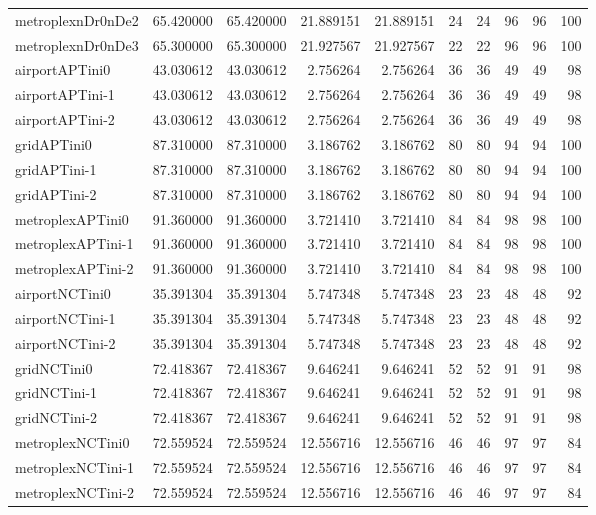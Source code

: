 \begin{longtable}{|l|r|r|r|r|r|r|r|r|r|}
metroplexnDr0nDe2 & 65.420000 & 65.420000 & 21.889151 & 21.889151 & 24 & 24 & 96 & 96 & 100 \\
metroplexnDr0nDe3 & 65.300000 & 65.300000 & 21.927567 & 21.927567 & 22 & 22 & 96 & 96 & 100 \\
airportAPTini0 & 43.030612 & 43.030612 & 2.756264 & 2.756264 & 36 & 36 & 49 & 49 & 98 \\
airportAPTini-1 & 43.030612 & 43.030612 & 2.756264 & 2.756264 & 36 & 36 & 49 & 49 & 98 \\
airportAPTini-2 & 43.030612 & 43.030612 & 2.756264 & 2.756264 & 36 & 36 & 49 & 49 & 98 \\
gridAPTini0 & 87.310000 & 87.310000 & 3.186762 & 3.186762 & 80 & 80 & 94 & 94 & 100 \\
gridAPTini-1 & 87.310000 & 87.310000 & 3.186762 & 3.186762 & 80 & 80 & 94 & 94 & 100 \\
gridAPTini-2 & 87.310000 & 87.310000 & 3.186762 & 3.186762 & 80 & 80 & 94 & 94 & 100 \\
metroplexAPTini0 & 91.360000 & 91.360000 & 3.721410 & 3.721410 & 84 & 84 & 98 & 98 & 100 \\
metroplexAPTini-1 & 91.360000 & 91.360000 & 3.721410 & 3.721410 & 84 & 84 & 98 & 98 & 100 \\
metroplexAPTini-2 & 91.360000 & 91.360000 & 3.721410 & 3.721410 & 84 & 84 & 98 & 98 & 100 \\
airportNCTini0 & 35.391304 & 35.391304 & 5.747348 & 5.747348 & 23 & 23 & 48 & 48 & 92 \\
airportNCTini-1 & 35.391304 & 35.391304 & 5.747348 & 5.747348 & 23 & 23 & 48 & 48 & 92 \\
airportNCTini-2 & 35.391304 & 35.391304 & 5.747348 & 5.747348 & 23 & 23 & 48 & 48 & 92 \\
gridNCTini0 & 72.418367 & 72.418367 & 9.646241 & 9.646241 & 52 & 52 & 91 & 91 & 98 \\
gridNCTini-1 & 72.418367 & 72.418367 & 9.646241 & 9.646241 & 52 & 52 & 91 & 91 & 98 \\
gridNCTini-2 & 72.418367 & 72.418367 & 9.646241 & 9.646241 & 52 & 52 & 91 & 91 & 98 \\
metroplexNCTini0 & 72.559524 & 72.559524 & 12.556716 & 12.556716 & 46 & 46 & 97 & 97 & 84 \\
metroplexNCTini-1 & 72.559524 & 72.559524 & 12.556716 & 12.556716 & 46 & 46 & 97 & 97 & 84 \\
metroplexNCTini-2 & 72.559524 & 72.559524 & 12.556716 & 12.556716 & 46 & 46 & 97 & 97 & 84 \\
\end{longtable}
